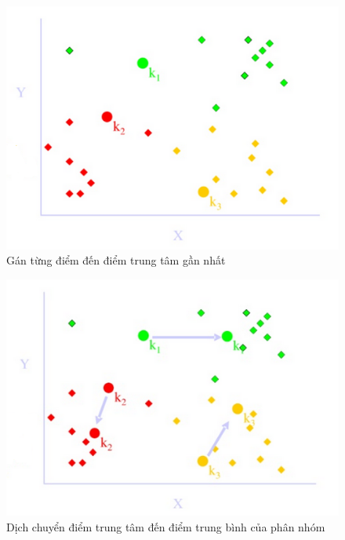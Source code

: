 \begin{figure}[htp]
\centering
\includegraphics{Images/k_means_02}
\caption{Gán từng điểm đến điểm trung tâm gần nhất}
\label{fig:k_means_02}
\end{figure}

\begin{figure}[htp]
\centering
\includegraphics{Images/k_means_03}
\caption{Dịch chuyển điểm trung tâm đến điểm trung bình của phân nhóm}
\label{fig:k_means_03}
\end{figure}

